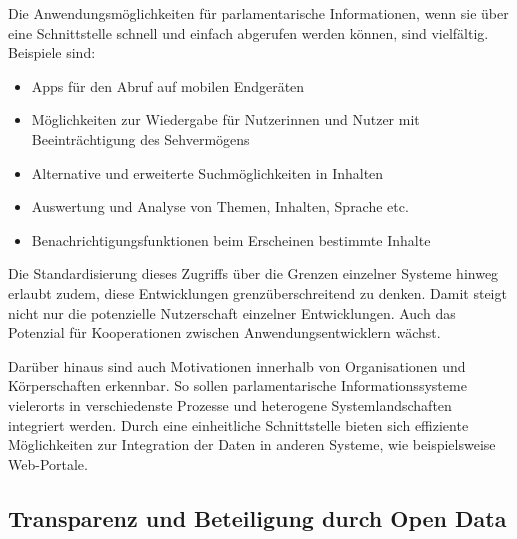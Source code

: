 \documentclass[,a4paper]{article}
\begin{document}
Die Anwendungsmöglichkeiten für parlamentarische Informationen, wenn sie
über eine Schnittstelle schnell und einfach abgerufen werden können,
sind vielfältig. Beispiele sind:

\begin{itemize}
\itemsep1pt\parskip0pt
\item
  Apps für den Abruf auf mobilen Endgeräten
\item
  Möglichkeiten zur Wiedergabe für Nutzerinnen und Nutzer mit
  Beeinträchtigung des Sehvermögens
\item
  Alternative und erweiterte Suchmöglichkeiten in Inhalten
\item
  Auswertung und Analyse von Themen, Inhalten, Sprache etc.
\item
  Benachrichtigungsfunktionen beim Erscheinen bestimmte Inhalte
\end{itemize}

Die Standardisierung dieses Zugriffs über die Grenzen einzelner Systeme
hinweg erlaubt zudem, diese Entwicklungen grenzüberschreitend zu denken.
Damit steigt nicht nur die potenzielle Nutzerschaft einzelner
Entwicklungen. Auch das Potenzial für Kooperationen zwischen
Anwendungsentwicklern wächst.

Darüber hinaus sind auch Motivationen innerhalb von Organisationen und
Körperschaften erkennbar. So sollen parlamentarische Informationssysteme
vielerorts in verschiedenste Prozesse und heterogene Systemlandschaften
integriert werden. Durch eine einheitliche Schnittstelle bieten sich
effiziente Möglichkeiten zur Integration der Daten in anderen Systeme,
wie beispielsweise Web-Portale.

\subsection{Transparenz und Beteiligung durch Open
Data}\label{transparenz-und-beteiligung-durch-open-data}
\end{document}
